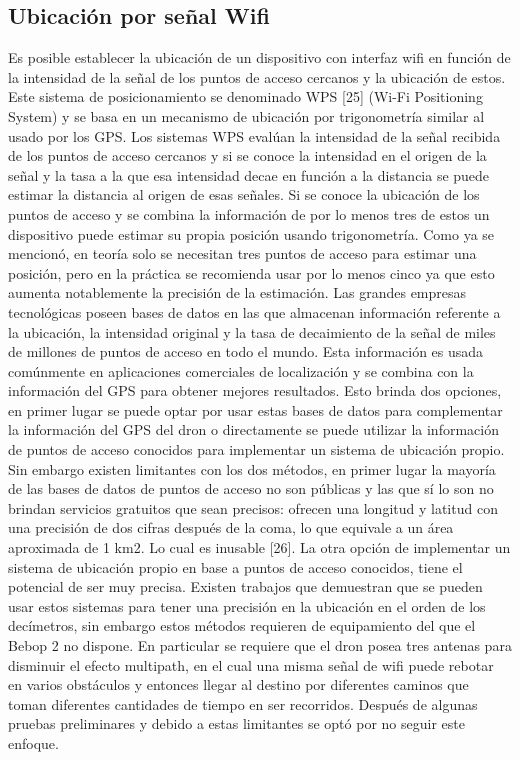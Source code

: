 \subsection {Ubicación por señal Wifi}
Es posible establecer la ubicación de un dispositivo con interfaz wifi en función de la intensidad de la señal de los puntos de acceso cercanos y la ubicación de estos. Este sistema de posicionamiento se denominado WPS [25] (Wi-Fi Positioning System) y se basa en un mecanismo de ubicación por trigonometría similar al usado por los GPS. Los sistemas WPS evalúan la intensidad de la señal recibida de los puntos de acceso cercanos y si se conoce la intensidad en el origen de la señal y la tasa a la que esa intensidad decae en función a la distancia se puede estimar la distancia al origen de esas señales. Si se conoce la ubicación de los puntos de acceso y se combina la información de por lo menos tres de estos un dispositivo puede estimar su propia posición usando trigonometría.
Como ya se mencionó, en teoría solo se necesitan tres puntos de acceso para estimar una posición, pero en la práctica se recomienda usar por lo menos cinco ya que esto aumenta notablemente la precisión de la estimación.
Las grandes empresas tecnológicas poseen bases de datos en las que almacenan información referente a la ubicación, la intensidad original y la tasa de decaimiento de la señal de miles de millones de puntos de acceso en todo el mundo. Esta información es usada comúnmente en aplicaciones comerciales de localización y se combina con la información del GPS para obtener mejores resultados.
Esto brinda dos opciones, en primer lugar se puede optar por usar estas bases de datos para complementar la información del GPS del dron o directamente se puede utilizar la información de puntos de acceso conocidos para implementar un sistema de ubicación propio.
Sin embargo existen limitantes con los dos métodos, en primer lugar la mayoría de las bases de datos de puntos de acceso no son públicas y las que sí lo son no brindan servicios gratuitos que sean precisos: ofrecen una longitud y latitud con una precisión de dos cifras después de la coma, lo que equivale a un área aproximada de 1 km2. Lo cual es inusable [26].
La otra opción de implementar un sistema de ubicación propio en base a puntos de acceso conocidos, tiene el potencial de ser muy precisa. Existen trabajos que demuestran que se pueden usar estos sistemas para tener una precisión en la ubicación en el orden de los decímetros, sin embargo estos métodos requieren de equipamiento del que el Bebop 2 no dispone. En particular se requiere que el dron posea tres antenas para disminuir el efecto multipath, en el cual una misma señal de wifi puede rebotar en varios obstáculos y entonces llegar al destino por diferentes caminos que toman diferentes cantidades de tiempo en ser recorridos.
Después de algunas pruebas preliminares y debido a estas limitantes se optó por no seguir este enfoque.
